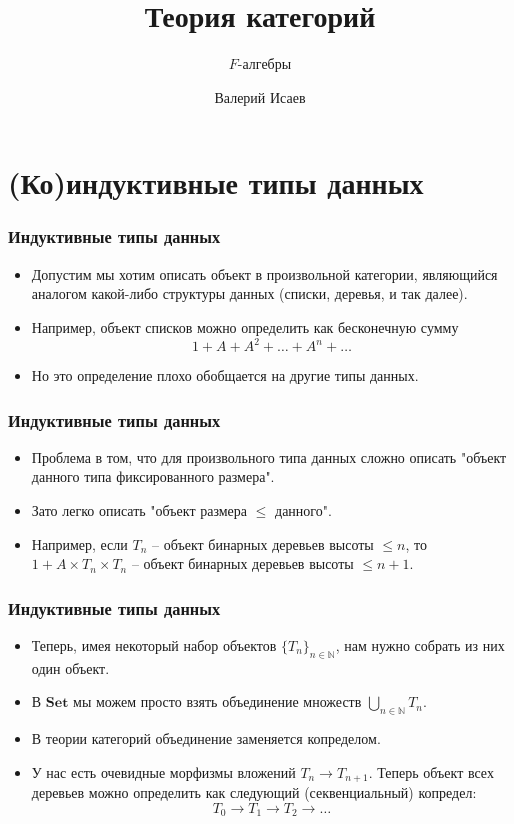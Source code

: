 \documentclass{beamer}
\theoremstyle{definition}
\newcommand{\cat}[1]{\mathbf{#1}}
\newcommand{\Set}{\cat{Set}}
\begin{document}
\title{Теория категорий}
\subtitle{$F$-алгебры}
\author{Валерий Исаев}
\maketitle

\section{(Ко)индуктивные типы данных}

\begin{frame}
\frametitle{Индуктивные типы данных}
\begin{itemize}
\item Допустим мы хотим описать объект в произвольной категории, являющийся аналогом какой-либо структуры данных (списки, деревья, и так далее).
\item Например, объект списков можно определить как бесконечную сумму
\[ 1 + A + A^2 + \ldots + A^n + \ldots \]
\item Но это определение плохо обобщается на другие типы данных.
\end{itemize}
\end{frame}

\begin{frame}
\frametitle{Индуктивные типы данных}
\begin{itemize}
\item Проблема в том, что для произвольного типа данных сложно описать "объект данного типа фиксированного размера".
\item Зато легко описать "объект размера $\leq$ данного".
\item Например, если $T_n$ -- объект бинарных деревьев высоты $\leq n$, то $1 + A \times T_n \times T_n$ -- объект бинарных деревьев высоты $\leq n + 1$.
\end{itemize}
\end{frame}

\begin{frame}
\frametitle{Индуктивные типы данных}
\begin{itemize}
\item Теперь, имея некоторый набор объектов $\{ T_n \}_{n \in \mathbb{N}}$, нам нужно собрать из них один объект.
\item В $\Set$ мы можем просто взять объединение множеств $\bigcup_{n \in \mathbb{N}} T_n$.
\item В теории категорий объединение заменяется копределом.
\item У нас есть очевидные морфизмы вложений $T_n \to T_{n+1}$. Теперь объект всех деревьев можно определить как следующий (секвенциальный) копредел:
\[ T_0 \to T_1 \to T_2 \to \ldots \]
\end{itemize}
\end{frame}
\end{document}
